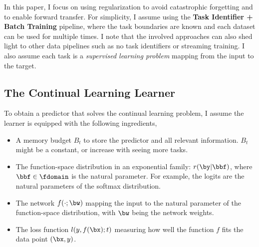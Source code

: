 In this paper, I focus on using regularization to avoid catastrophic forgetting and to enable forward transfer. For simplicity, I assume using the \textbf{Task Identifier + Batch Training} pipeline, where the task boundaries are known and each dataset can be used for multiple times. I note that the involved approaches can also shed light to other data pipelines such as no task identifiers or streaming training. I also assume each task is a \emph{supervised learning problem} mapping from the input to the target.

\subsection{The Continual Learning Learner}
To obtain a predictor that solves the continual learning problem, I assume the learner is equipped with the following ingredients,
\begin{itemize}
    \item A memory budget $B_t$ to store the predictor and all relevant information. $B_t$ might be a constant, or increase with seeing more tasks.
    \item The function-space distribution in an exponential family: $r(\by | \bbf)$, where $\bbf \in \fdomain$ is the natural parameter. For example, the logits are the natural parameters of the softmax distribution.
   \item The network $f(\cdot; \bw)$ mapping the input to the natural parameter of the function-space distribution, with $\bw$ being the network weights.
   \item The loss function $l(y, f(\bx); t)$  measuring how well the function $f$ fits the data point $(\bx, y)$.
\end{itemize}


